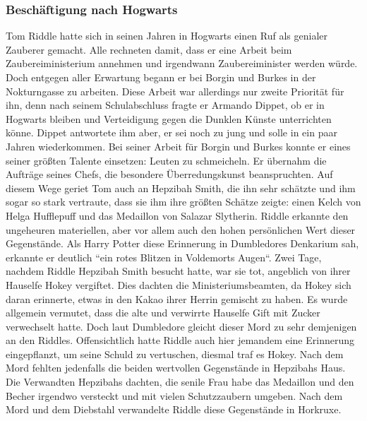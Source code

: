 \documentclass[a4paper, 10pt]{article}
\begin{document}
\subsubsection*{\large Beschäftigung nach Hogwarts}
Tom Riddle hatte sich in seinen Jahren in Hogwarts einen Ruf als genialer Zauberer gemacht. Alle rechneten damit, dass er eine Arbeit beim Zaubereiministerium annehmen und irgendwann Zaubereiminister werden würde. Doch entgegen aller Erwartung begann er bei Borgin und Burkes in der Nokturngasse zu arbeiten. Diese Arbeit war allerdings nur zweite Priorität für ihn, denn nach seinem Schulabschluss fragte er Armando Dippet, ob er in Hogwarts bleiben und Verteidigung gegen die Dunklen Künste unterrichten könne. Dippet antwortete ihm aber, er sei noch zu jung und solle in ein paar Jahren wiederkommen.
\vspace{10pt}
\newline
{}  
Bei seiner Arbeit für Borgin und Burkes konnte er eines seiner größten Talente einsetzen: Leuten zu schmeicheln. Er übernahm die Aufträge seines Chefs, die besondere Überredungskunst beanspruchten. Auf diesem Wege geriet Tom auch an Hepzibah Smith, die ihn sehr schätzte und ihm sogar so stark vertraute, dass sie ihm ihre größten Schätze zeigte: einen Kelch von Helga Hufflepuff und das Medaillon von Salazar Slytherin. Riddle erkannte den ungeheuren materiellen, aber vor allem auch den hohen persönlichen Wert dieser Gegenstände. Als Harry Potter diese Erinnerung in Dumbledores Denkarium sah, erkannte er deutlich “ein rotes Blitzen in Voldemorts Augen“. Zwei Tage, nachdem Riddle Hepzibah Smith besucht hatte, war sie tot, angeblich von ihrer Hauselfe Hokey vergiftet. Dies dachten die Ministeriumsbeamten, da Hokey sich daran erinnerte, etwas in den Kakao ihrer Herrin gemischt zu haben. Es wurde allgemein vermutet, dass die alte und verwirrte Hauselfe Gift mit Zucker verwechselt hatte. Doch laut Dumbledore gleicht dieser Mord zu sehr demjenigen an den Riddles. Offensichtlich hatte Riddle auch hier jemandem eine Erinnerung eingepflanzt, um seine Schuld zu vertuschen, diesmal traf es Hokey. Nach dem Mord fehlten jedenfalls die beiden wertvollen Gegenstände in Hepzibahs Haus. Die Verwandten Hepzibahs dachten, die senile Frau habe das Medaillon und den Becher irgendwo versteckt und mit vielen Schutzzaubern umgeben.
\vspace{10pt}
\newline
{}  
Nach dem Mord und dem Diebstahl verwandelte Riddle diese Gegenstände in Horkruxe.
\end{document}
